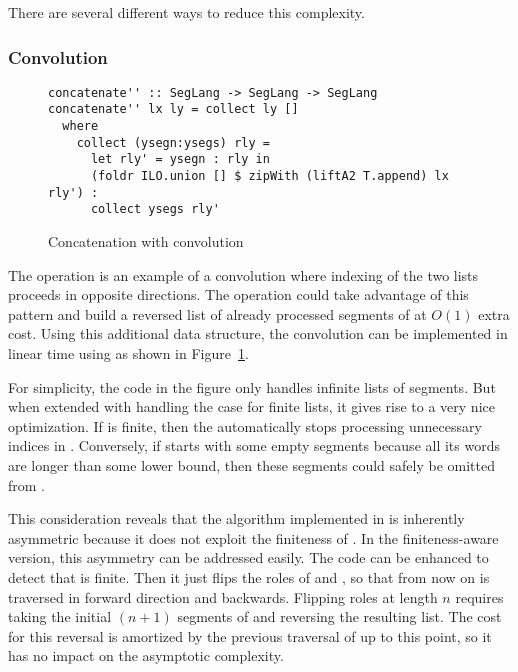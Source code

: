 There are several different ways to reduce this complexity.

\subsubsection{Convolution}
\label{sec:convolution}

\begin{figure}[tp]
\begin{lstlisting}
concatenate'' :: SegLang -> SegLang -> SegLang
concatenate'' lx ly = collect ly []
  where
    collect (ysegn:ysegs) rly =
      let rly' = ysegn : rly in
      (foldr ILO.union [] $ zipWith (liftA2 T.append) lx rly') :
      collect ysegs rly'
\end{lstlisting}
  \caption{Concatenation with convolution}
  \label{fig:concatenation-with-convolution}
\end{figure}
The  operation is an example of a convolution where
indexing of the two lists proceeds in opposite directions. The  operation
could take advantage of this pattern and build a reversed list  of already
processed segments of  at $O(1)$ extra cost. Using this additional data structure, the
convolution can be implemented in linear time using
 as shown in Figure~\ref{fig:concatenation-with-convolution}.

For simplicity, the code in the figure only handles infinite lists of
segments. But when extended with handling the case for finite lists,
it gives rise to a very nice optimization. If  is finite,
then the  automatically stops processing unnecessary indices in
. Conversely, if  starts with some empty segments
because all its words are longer than some lower bound, then these
segments could safely be omitted from .

This consideration reveals that the algorithm implemented in
 is inherently asymmetric because it does not
exploit the finiteness of . In the finiteness-aware version, this asymmetry can be
addressed easily.  The code can be
enhanced to detect that  is finite. Then it just flips the roles of
 and , so that from now on  is traversed in 
forward direction and  backwards. Flipping roles at length $n$ requires taking
the initial $(n+1)$ segments of  and reversing the resulting
list. The cost for this reversal is amortized by the previous traversal of
 up to this point, so it has no impact on the asymptotic
complexity.

